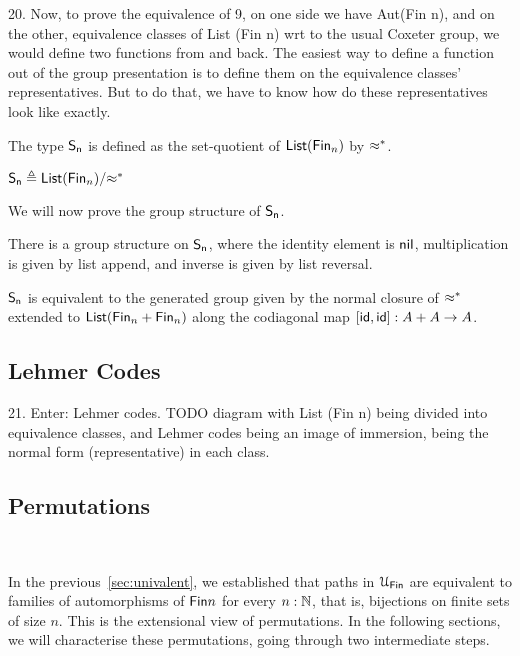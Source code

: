 20. Now, to prove the equivalence of 9, on one side we have Aut(Fin n), and
on the other, equivalence classes of List (Fin n) wrt to the usual Coxeter
group, we would define two functions from and back. The easiest way to
define a function out of the group presentation is to define them on the
equivalence classes' representatives. But to do that, we have to know how
do these representatives look like exactly.

The type $\Sn$ is defined as the set-quotient of $\List[\Fin[n]]$ by $\cox*$.

\begin{definition}[$\Sn$]
  \(\Sn \defeq \quot{\List(\Fin[n])}{\cox*}\)
\end{definition}

We will now prove the group structure of $\Sn$.

\begin{proposition}
  There is a group structure on $\Sn$, where the identity element is $\operatorname{\mathsf{nil}}$, multiplication is given by list append, and
  inverse is given by list reversal.
\end{proposition}

\begin{proposition}
  $\Sn$ is equivalent to the generated group given by the normal closure of $\cox*$ extended to
  $\List(\Fin[n] + \Fin[n])$ along the codiagonal map $[\operatorname{\mathsf{id}},\operatorname{\mathsf{id}}] : A + A \to A$.
\end{proposition}

\subsection{Lehmer Codes}

21. Enter: Lehmer codes.
TODO diagram with List (Fin n) being divided into equivalence classes, and
Lehmer codes being an image of immersion, being the normal form
(representative) in each class.

\subsection{Permutations}~\label{subsec:permutations}

In the previous~\cref{sec:univalent}, we established that paths in $\UFin$ are
equivalent to families of automorphisms of $\Fin{n}$ for every $n:\mathbb{N}$, that
is, bijections on finite sets of size $n$. This is the extensional view of
permutations. In the following sections, we will characterise these
permutations, going through two intermediate steps.

